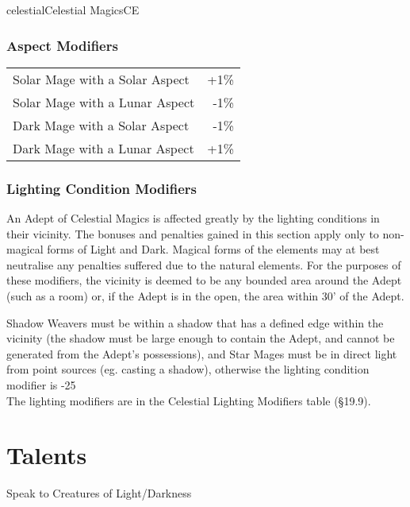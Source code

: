 \begin{College}[1.3]{celestial}{Celestial Magics}{CE}
\subsubsection{Aspect Modifiers}

\begin{tabularx}{\columnwidth}{Xr}
Solar Mage with a Solar Aspect	& +1\% \\
Solar Mage with a Lunar Aspect	& -1\% \\
Dark Mage with a Solar Aspect	& -1\% \\
Dark Mage with a Lunar Aspect	& +1\% \\
\end{tabularx}

\subsubsection{Lighting Condition Modifiers}

An Adept of Celestial Magics is affected greatly by the lighting
conditions in their vicinity.  The bonuses and penalties gained in
this section apply only to non-magical forms of Light and Dark.
Magical forms of the elements may at best neutralise any penalties
suffered due to the natural elements.  For the purposes of these
modifiers, the vicinity is deemed to be any bounded area around the
Adept (such as a room) or, if the Adept is in the open, the area
within 30’ of the Adept.

Shadow Weavers must be within a shadow that has a defined edge within
the vicinity (the shadow must be large enough to contain the Adept,
and cannot be generated from the Adept’s possessions), and Star Mages
must be in direct light from point sources (eg. casting a shadow),
otherwise the lighting condition modifier is -25\\%

The lighting modifiers are in the Celestial Lighting Modifiers table
(§19.9).


\section{Talents}

\begin{talent}[T-1]{Speak to Creatures of Light/Darkness}


\end{talent}
\end{College}
